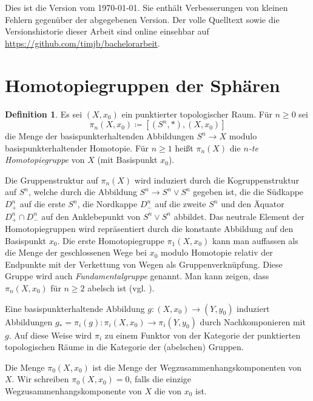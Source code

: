 \documentclass[11pt, a4paper, german]{article}
\theoremstyle{definition}
\newtheorem{defn}[lem]{Definition}
\theoremstyle{remark}
\begin{document}


\tableofcontents

\vspace{12cm}

{
  \footnotesize
  Dies ist die Version vom \today{}.
  Sie enthält Verbesserungen von kleinen Fehlern gegenüber der abgegebenen Version.
  Der volle Quelltext sowie die Versionshistorie dieser Arbeit sind online einsehbar auf \url{https://github.com/timjb/bachelorarbeit}.
}

\newpage

\section{Homotopiegruppen der Sphären}

\begin{defn}
  Es sei $(X, x_0)$ ein punktierter topologischer Raum.
  Für $n \geq 0$ sei
  \[ \pi_n(X, x_0) \coloneqq [(S^n, *), (X, x_0)] \]
  die Menge der basispunkterhaltenden Abbildungen $S^n \to X$ modulo basispunkterhaltender Homotopie.
  Für $n \geq 1$ heißt $\pi_n(X)$ die \emph{$n$-te Homotopiegruppe} von $X$ (mit Basispunkt $x_0$).
\end{defn}

Die Gruppenstruktur auf $\pi_n(X)$ wird induziert durch die Kogruppenstruktur auf $S^n$, welche durch die Abbildung $S^n \to S^n \vee S^n$ gegeben ist, die die Südkappe $D^n_+$ auf die erste $S^n$, die Nordkappe $D^n_{-}$ auf die zweite $S^n$ und den Äquator $D^n_{+} \cap D^n_{-}$ auf den Anklebepunkt von $S^n \vee S^n$ abbildet.
Das neutrale Element der Homotopiegruppen wird repräsentiert durch die konstante Abbildung auf den Basispunkt $x_0$.
Die erste Homotopiegruppe $\pi_1(X, x_0)$ kann man auffassen als die Menge der geschlossenen Wege bei $x_0$ modulo Homotopie relativ der Endpunkte mit der Verkettung von Wegen als Gruppenverknüpfung.
Diese Gruppe wird auch \emph{Fundamentalgruppe} genannt.
Man kann zeigen, dass $\pi_n(X, x_0)$ für $n \geq 2$ abelsch ist (vgl. \cite[340]{hatcher:at}).

Eine basispunkterhaltende Abbildung $g : (X, x_0) \to (Y, y_0)$ induziert Abbildungen $g_* = \pi_i(g) : \pi_i(X, x_0) \to \pi_i(Y, y_0)$ durch Nachkomponieren mit $g$.
Auf diese Weise wird $\pi_i$ zu einem Funktor von der Kategorie der punktierten topologischen Räume in die Kategorie der (abelschen) Gruppen.

Die Menge $\pi_0(X, x_0)$ ist die Menge der Wegzusammenhangskomponenten von $X$.
Wir schreiben $\pi_0(X, x_0) = 0$, falls die einzige Wegzusammenhangskomponente von $X$ die von $x_0$ ist.
\end{document}
